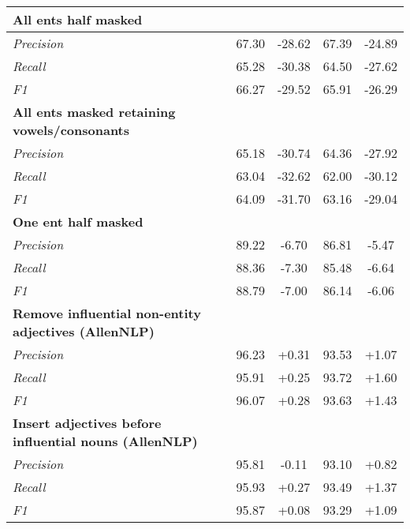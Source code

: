 \begin{table}[t]
\begin{singlespace}
\begin{tabular}{@{} R{0.17\textwidth} c c c c @{}}
        \textbf{All ents half masked} &&&&               \\\midrule
            \textit{Precision}  & 67.30 & -28.62 & 67.39 & -24.89   \\ 
            \textit{Recall}     & 65.28 & -30.38 & 64.50 & -27.62   \\ 
            \textit{F1}         & 66.27 & -29.52 & 65.91 & -26.29   \\\bottomrule
        
        \textbf{All ents masked retaining vowels/consonants} &&&&     \\\midrule
            \textit{Precision}  & 65.18 & -30.74 & 64.36 & -27.92   \\ 
            \textit{Recall}     & 63.04 & -32.62 & 62.00 & -30.12   \\ 
            \textit{F1}         & 64.09 & -31.70 & 63.16 & -29.04   \\\bottomrule
            
        \textbf{One ent half masked} &&&&                        \\\midrule
            \textit{Precision}  & 89.22 & -6.70 & 86.81 & -5.47   \\ 
            \textit{Recall}     & 88.36 & -7.30 & 85.48 & -6.64   \\ 
            \textit{F1}         & 88.79 & -7.00 & 86.14 & -6.06   \\\bottomrule
            
        \textbf{Remove influential non-entity adjectives (AllenNLP)} &&&&                        \\\midrule
            \textit{Precision}  & 96.23 & +0.31 & 93.53 & +1.07   \\ 
            \textit{Recall}     & 95.91 & +0.25 & 93.72 & +1.60   \\ 
            \textit{F1}         & 96.07 & +0.28 & 93.63 & +1.43   \\\bottomrule
            
        \textbf{Insert adjectives before influential nouns (AllenNLP)} &&&&                        \\\midrule
            \textit{Precision}  & 95.81 & -0.11 & 93.10 & +0.82   \\ 
            \textit{Recall}     & 95.93 & +0.27 & 93.49 & +1.37   \\ 
            \textit{F1}         & 95.87 & +0.08 & 93.29 & +1.09   \\\bottomrule
            

\end{tabular}
\end{singlespace}
\end{table}
